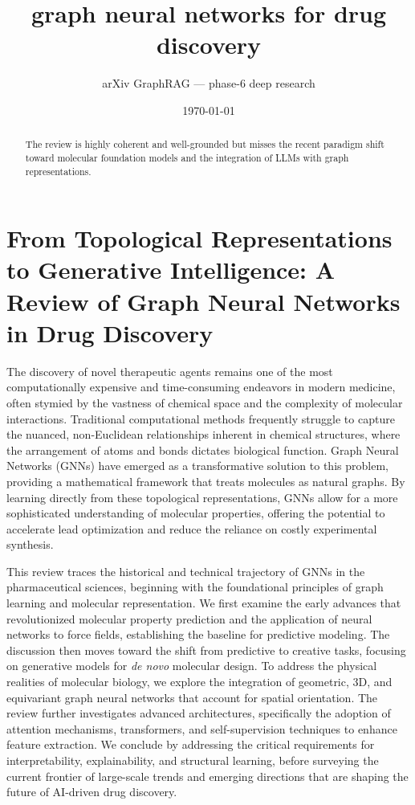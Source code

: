 \documentclass[11pt]{article}
\title{graph neural networks for drug discovery}
\author{arXiv GraphRAG --- phase-6 deep research}
\date{\today}
\begin{document}
\maketitle

\begin{abstract}
The review is highly coherent and well-grounded but misses the recent paradigm shift toward molecular foundation models and the integration of LLMs with graph representations.
\end{abstract}

\section{From Topological Representations to Generative Intelligence: A Review of Graph Neural Networks in Drug Discovery}

The discovery of novel therapeutic agents remains one of the most computationally expensive and time-consuming endeavors in modern medicine, often stymied by the vastness of chemical space and the complexity of molecular interactions. Traditional computational methods frequently struggle to capture the nuanced, non-Euclidean relationships inherent in chemical structures, where the arrangement of atoms and bonds dictates biological function. Graph Neural Networks (GNNs) have emerged as a transformative solution to this problem, providing a mathematical framework that treats molecules as natural graphs. By learning directly from these topological representations, GNNs allow for a more sophisticated understanding of molecular properties, offering the potential to accelerate lead optimization and reduce the reliance on costly experimental synthesis.

This review traces the historical and technical trajectory of GNNs in the pharmaceutical sciences, beginning with the foundational principles of graph learning and molecular representation. We first examine the early advances that revolutionized molecular property prediction and the application of neural networks to force fields, establishing the baseline for predictive modeling. The discussion then moves toward the shift from predictive to creative tasks, focusing on generative models for \textit{de novo} molecular design. To address the physical realities of molecular biology, we explore the integration of geometric, 3D, and equivariant graph neural networks that account for spatial orientation. The review further investigates advanced architectures, specifically the adoption of attention mechanisms, transformers, and self-supervision techniques to enhance feature extraction. We conclude by addressing the critical requirements for interpretability, explainability, and structural learning, before surveying the current frontier of large-scale trends and emerging directions that are shaping the future of AI-driven drug discovery.
\end{document}
